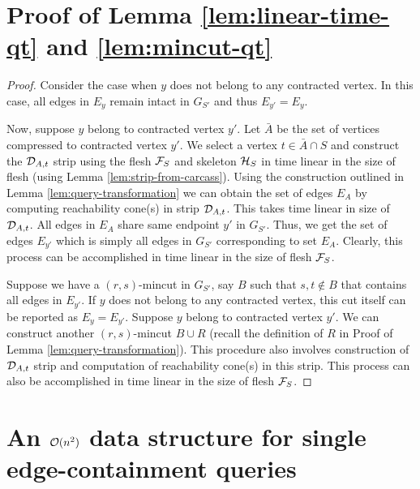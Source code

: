 \section{Proof of Lemma \ref{lem:linear-time-qt} and \ref{lem:mincut-qt}}
\label{appendix:linear-time-qt}
\begin{proof}
Consider the case when $y$ does not belong to any contracted vertex. In this case, all edges in $E_y$ remain intact in $G_{S'}$ and thus $E_{y'}=E_{y}$.

Now, suppose $y$ belong to contracted vertex $y'$. Let $\bar A$ be the set of vertices compressed to contracted vertex $y'$. We select a vertex $t\in {\bar A} \cap S$ and construct the ${\cal D}_{A,t}$ strip using the flesh ${\cal F}_S$ and skeleton ${\cal H}_S$ in time linear in the size of flesh (using Lemma \ref{lem:strip-from-carcass}). Using the construction outlined in Lemma \ref{lem:query-transformation} we can obtain the set of edges $E_{A}$ by computing reachability cone(s) in strip ${\cal D}_{A,t}$. This takes time linear in size of ${\cal D}_{A,t}$. All edges in $E_A$ share same endpoint $y'$ in $G_{S'}$. Thus, we get the set of edges $E_{y'}$ which is simply all edges in $G_{S'}$ corresponding to set $E_A$. Clearly, this process can be accomplished in time linear in the size of flesh ${\cal F}_S$.

Suppose we have a $(r,s)$-mincut in $G_{S'}$, say $B$ such that $s,t \not\in B$ that contains all edges in $E_{y'}$. If $y$ does not belong to any contracted vertex, this cut itself can be reported as $E_y=E_{y'}$. Suppose $y$ belong to contracted vertex $y'$. We can construct another $(r,s)$-mincut $B\cup R$ (recall the definition of $R$ in Proof of Lemma \ref{lem:query-transformation}). This procedure also involves construction of ${\cal D}_{A,t}$ strip and computation of reachability cone(s) in this strip. This process can also be accomplished in time linear in the size of flesh ${\cal F}_S$.
\end{proof}

\section{\texorpdfstring{An ${\cal O}(n^2)$}{A quadratic space} data structure for single edge-containment queries} \label{appendix:n2-ds}


